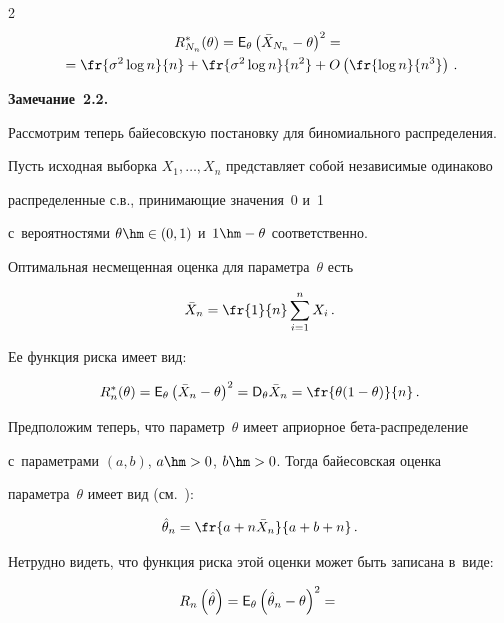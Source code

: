 \begin{multicols}{2}
\begin{multline*}
R^*_{N_n}(\theta) = {\sf E}_\theta \left(\bar X_{N_n} - \theta\right)^2 ={}\\


{}=


\fr{\sigma^2\log n}{n} + \fr{\sigma^2\log n}{n^2} +  O\left(\fr{\log n}{n^3}\right)\,.


\end{multline*}





\noindent


\textbf{Замечание~2.2.}


Рассмотрим теперь байесовскую постановку для биномиального распределения. 


Пусть исходная выборка $X_1,\ldots,X_n$ представляет собой независимые одинаково 


распределенные с.в., принимающие значения~0 и~1 


с~вероятностями $\theta\hm \in (0,1)$ и~$1\hm - \theta$ соответственно.


Оптимальная несмещенная оценка для параметра~$\theta$ есть


$$


\bar X_n = \fr{1}{n} \sum\limits_{i=1}^n X_i\,.


$$


Ее функция риска имеет вид:


$$


R^*_{n}(\theta) = {\sf E}_\theta \left(\bar X_n - \theta\right)^2 =


 {\sf D}_\theta \bar X_n =\fr{\theta(1 - \theta)}{n}\,.


$$


Предположим теперь, что параметр~$\theta$ имеет априорное бе\-та-рас\-пре\-де\-ле\-ние 


с~параметрами $(a,b)$, $a\hm > 0$, $b\hm > 0$. Тогда байесовская оценка 


параметра~$\theta$ имеет вид (см.~\cite[с.~221]{4-ben}):


$$


\hat\theta_n = \fr{a + n\bar X_n}{a + b + n}\,.


$$


Нетрудно видеть, что функция риска этой оценки может быть записана в~виде:


\begin{multline*}


R_{n}\left(\hat\theta\right) = {\sf E}_\theta \left(\hat\theta_n - \theta\right)^2 ={}\\



\end{multline*}
\end{multicols}
